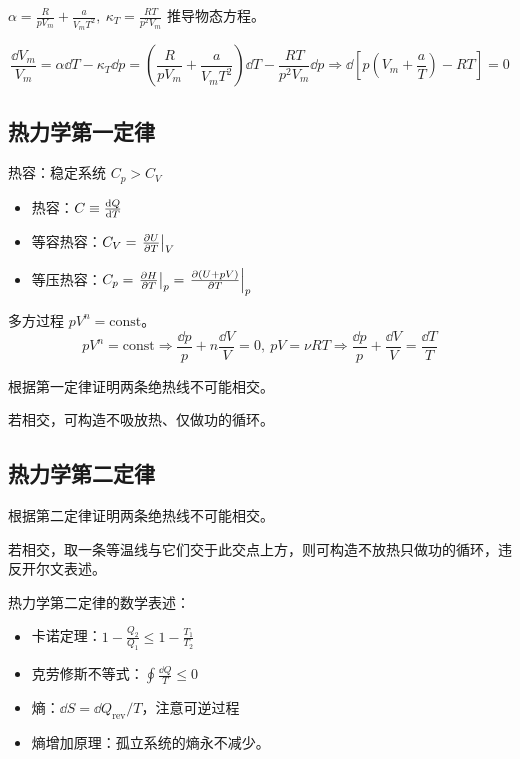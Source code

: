 \begin{framed}
    $\alpha = \frac{R}{p V_m} + \frac{a}{V_m T^2},\ \kappa_T = \frac{R T}{p^2 V_m}$ 推导物态方程。

    \[
        \frac{\dd{V_m}}{V_m} = \alpha \dd{T} - \kappa_T \dd{p} = (\frac{R}{p V_m} + \frac{a}{V_m T^2}) \dd{T} - \frac{R T}{p^2 V_m} \dd{p} \Rightarrow \dd{\left[p \left(V_m + \frac{a}{T}\right) - R T\right]} = 0
    \]
\end{framed}

\subsection{热力学第一定律}

热容：稳定系统 $C_p > C_V$

\begin{itemize}
    \item 热容：$C \equiv \dv{Q}{T}$
    \item 等容热容：$C_V = \left.\pdv{U}{T}\right|_V$
    \item 等压热容：$C_p = \left.\pdv{H}{T}\right|_p = \left.\pdv{(U + pV)}{T}\right|_p$
\end{itemize}

\begin{framed}
    多方过程 $p V^n = \text{const}$。
    \[
        p V^n = \text{const} \Rightarrow \frac{\dd{p}}{p} + n \frac{\dd{V}}{V} = 0,\ p V = \nu R T \Rightarrow \frac{\dd{p}}{p} + \frac{\dd{V}}{V} = \frac{\dd{T}}{T}
    \]
\end{framed}

\begin{framed}
    根据第一定律证明两条绝热线不可能相交。

    若相交，可构造不吸放热、仅做功的循环。
\end{framed}

\subsection{热力学第二定律}

\begin{framed}
    根据第二定律证明两条绝热线不可能相交。

    若相交，取一条等温线与它们交于此交点上方，则可构造不放热只做功的循环，违反开尔文表述。
\end{framed}

热力学第二定律的数学表述：
\begin{itemize}
    \item 卡诺定理：$1 - \frac{Q_2}{Q_1} \leq 1 - \frac{T_1}{T_2}$
    \item 克劳修斯不等式：$\oint \frac{\dd{Q}}{T} \leq 0$
    \item 熵：$\dd{S} = \dd{Q_{\text{rev}}} / T$，注意可逆过程
    \item 熵增加原理：孤立系统的熵永不减少。
\end{itemize}

